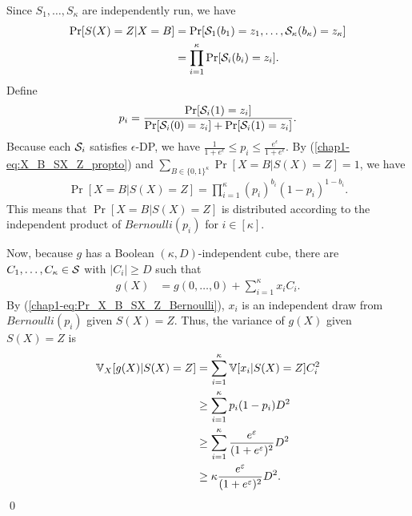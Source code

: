 {Since $S_1, \ldots, S_\kappa$ are independently run, we have
\begin{align*}
  \Pr[S(X)=Z|X=B] 
  &=
  \Pr[\mathcal{S}_1(b_1) = z_1, \ldots, \mathcal{S}_\kappa(b_\kappa) = z_\kappa] \\
  &= \prod_{i=1}^\kappa \Pr[\mathcal{S}_i(b_i)=z_i].
\end{align*}
Define 
\begin{align*}
    p_i = \frac{\Pr[\mathcal{S}_i(1)=z_i]}{\Pr[\mathcal{S}_i(0)=z_i] +
    \Pr[\mathcal{S}_i(1)=z_i]}.
\end{align*}
Because each $\mathcal{S}_i$ satisfies $\epsilon$-DP, we have $\frac{1}{1+e^{\epsilon}} \leq p_i \leq \frac{e^\epsilon}{1+e^\epsilon}$.
By (\ref{chap1-eq:X_B_SX_Z_propto}) and $\sum_{B \in \{0,1\}^\kappa} \Pr[X=B|S(X)=Z] = 1$, 
we have
\begin{align}
    \Pr[X=B|S(X)=Z] 
    = 
    \prod_{i=1}^\kappa (p_i)^{b_i}(1-p_i)^{1-b_i}. %
\label{chap1-eq:Pr_X_B_SX_Z_Bernoulli}
\end{align}
This means that $\Pr[X=B|S(X)=Z]$ is distributed according to the independent product of $Bernoulli(p_i)$ for $i \in [\kappa]$.

Now, because 
$g$ has 
a Boolean $(\kappa,D)$-independent cube, 
there are $C_1,
\ldots, C_\kappa \in \mathcal{S}$ with $|C_i| \geq D$ such that
\begin{align*}
g(X) &= g(0, \ldots, 0) + \sum_{i=1}^\kappa
x_iC_i.
\end{align*}
By (\ref{chap1-eq:Pr_X_B_SX_Z_Bernoulli}), 
$x_i$ 
is an independent draw from $Bernoulli(p_i)$ 
given $S(X)=Z$. 
Thus, the variance of 
$g(X)$ given $S(X)=Z$ 
is
\begin{align*}
\mathbb{V}_X[g(X)|S(X)=Z] &= \sum_{i=1}^\kappa \mathbb{V}[x_i |S(X)=Z]C_i^2 \\
&\geq \sum_{i=1}^\kappa p_i(1-p_i) D^2 \\
&\geq \sum_{i=1}^\kappa \frac{e^\varepsilon}{(1+e^\varepsilon)^2} D^2 \\
&\geq \kappa \frac{e^\varepsilon}{(1+e^\varepsilon)^2} D^2.
\end{align*}
\qed
}
% 
